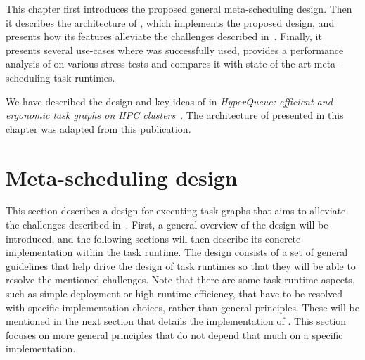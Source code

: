 This chapter first introduces the proposed general meta-scheduling design. Then it describes the
architecture of \hyperqueue{}, which implements the proposed design, and presents how its
features alleviate the challenges described in~. Finally, it presents
several use-cases where \hyperqueue{} was successfully used, provides a performance
analysis of \hyperqueue{} on various stress tests and compares it with state-of-the-art
meta-scheduling task runtimes.

We have described the design and key ideas of \hyperqueue{} in
\emph{HyperQueue: efficient and ergonomic task graphs on HPC clusters}~\cite{hyperqueue}. The architecture of \hyperqueue{}
presented in this chapter was adapted from this publication.


\section{Meta-scheduling design}
This section describes a design for executing task graphs that aims to alleviate the challenges
described in~. First, a general overview of the design will be introduced,
and the following sections will then describe its concrete implementation within the
\hyperqueue{} task runtime. The design consists of a set of general guidelines that help
drive the design of task runtimes so that they will be able to resolve the mentioned challenges.
Note that there are some task runtime aspects, such as simple deployment or high runtime
efficiency, that have to be resolved with specific implementation choices, rather than general
principles. These will be mentioned in the next section that details the implementation of
\hyperqueue{}. This section focuses on more general principles that do not depend that
much on a specific implementation.

